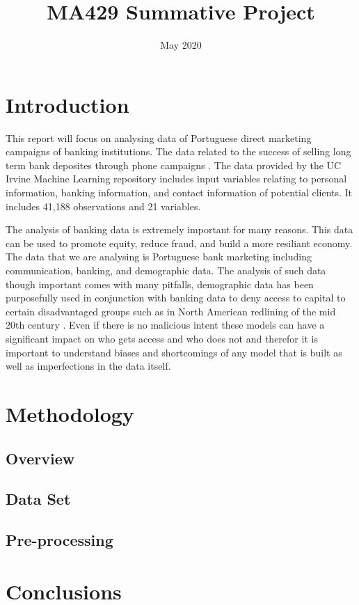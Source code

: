 \documentclass[a4paper, oneside, 11pt]{article}
\title{MA429 Summative Project}
\author{}
\date{May 2020}
\begin{document}
\maketitle

\section{Introduction}
This report will focus on analysing data of Portuguese direct marketing campaigns of banking institutions. The data related to the success of selling long term bank deposites through phone campaigns \cite{moro_data-driven_2014}. The data provided by the UC Irvine Machine Learning repository includes input variables relating to personal information, banking information, and contact information of potential clients. It includes 41,188 observations and 21 variables.

The analysis of banking data is extremely important for many reasons. This data can be used to promote equity, reduce fraud, and build a more resiliant economy. The data that we are analysing is Portuguese bank marketing including communication, banking, and demographic data. The analysis of such data though important comes with many pitfalls, demographic data has been purposefully used in conjunction with banking data to deny access to capital to certain disadvantaged groups such as in North American redlining of the mid 20th century \cite{harris_suburban_2003}. Even if there is no malicious intent these models can have a significant impact on who gets access and who does not and therefor it is important to understand biases and shortcomings of any model that is built as well as imperfections in the data itself.


\section{Methodology}
\subsection{Overview}


\subsection{Data Set}

\subsection{Pre-processing}


\section{Conclusions}




\end{document}
